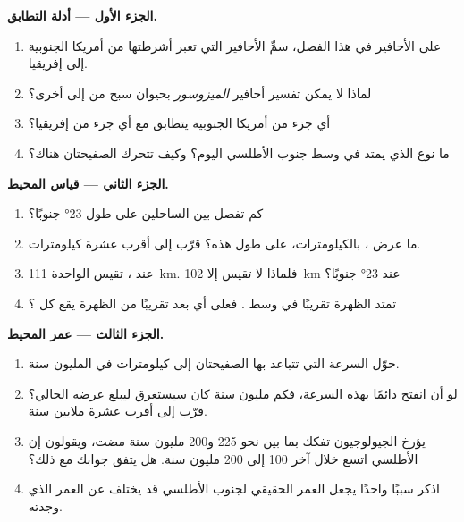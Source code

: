 \begin{problem}
\medskip
\noindent\textbf{الجزء الأول --- أدلة التطابق.}
\begin{enumerate}
  \item على  الأحافير في هذا الفصل، سمِّ الأحافير التي تعبر أشرطتها
        من أمريكا الجنوبية إلى إفريقيا.
  \item لماذا لا يمكن تفسير أحافير \emph{الميزوسور} بحيوان
        سبح من  إلى أخرى؟
  \item أي جزء من أمريكا الجنوبية يتطابق مع أي جزء من إفريقيا؟
  \item ما نوع  الذي يمتد في وسط جنوب
        الأطلسي اليوم؟ وكيف تتحرك الصفيحتان هناك؟
\end{enumerate}

\medskip
\noindent\textbf{الجزء الثاني --- قياس المحيط.}
\begin{enumerate}[resume]
  \item كم  تفصل بين الساحلين على طول
         \ang{23} جنوبًا؟
  \item ما عرض ، بالكيلومترات، على طول 
        هذه؟ قرّب إلى أقرب عشرة كيلومترات.
  \item عند ، تقيس  الواحدة \qty{111}{km}.
        فلماذا لا تقيس إلا \qty{102}{km} عند \ang{23} جنوبًا؟
  \item تمتد الظهرة تقريبًا في وسط . فعلى أي بعد تقريبًا
        من الظهرة يقع كل ؟
\end{enumerate}

\medskip
\noindent\textbf{الجزء الثالث --- عمر المحيط.}
\begin{enumerate}[resume]
  \item حوّل السرعة التي تتباعد بها الصفيحتان إلى
        كيلومترات في المليون سنة.
  \item لو أن  انفتح دائمًا بهذه السرعة، فكم مليون
        سنة كان سيستغرق ليبلغ عرضه الحالي؟ قرّب إلى
        أقرب عشرة ملايين سنة.
  \item يؤرخ الجيولوجيون تفكك  بما بين نحو 225
        و200 مليون سنة مضت، ويقولون إن الأطلسي اتسع خلال
        آخر 100 إلى 200 مليون سنة. هل يتفق جوابك مع ذلك؟
  \item اذكر سببًا واحدًا يجعل العمر الحقيقي لجنوب الأطلسي قد يختلف
        عن العمر الذي وجدته.
\end{enumerate}
\end{problem}
